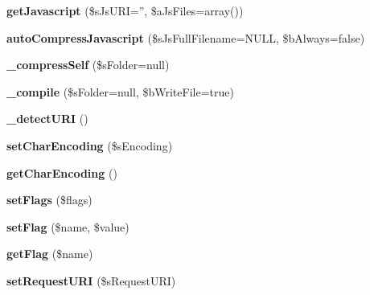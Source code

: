 \begin{DoxyCompactItemize}
\item 
\hypertarget{classxajax_aac03129341890d07050b35a488718118}{
{\bfseries getJavascript} (\$sJsURI='', \$aJsFiles=array())}
\label{classxajax_aac03129341890d07050b35a488718118}

\item 
\hypertarget{classxajax_a9b4cd2b4b2576b16cff68cf4c9843b78}{
{\bfseries autoCompressJavascript} (\$sJsFullFilename=NULL, \$bAlways=false)}
\label{classxajax_a9b4cd2b4b2576b16cff68cf4c9843b78}

\item 
\hypertarget{classxajax_af764cb5ec5b5fa118c7d837ec0d7e990}{
{\bfseries \_\-compressSelf} (\$sFolder=null)}
\label{classxajax_af764cb5ec5b5fa118c7d837ec0d7e990}

\item 
\hypertarget{classxajax_a0b0a2a477413be39dc96ec79fd35211a}{
{\bfseries \_\-compile} (\$sFolder=null, \$bWriteFile=true)}
\label{classxajax_a0b0a2a477413be39dc96ec79fd35211a}

\item 
\hypertarget{classxajax_a2dd296797c91ccd14a99cd9fe88f9a96}{
{\bfseries \_\-detectURI} ()}
\label{classxajax_a2dd296797c91ccd14a99cd9fe88f9a96}

\item 
\hypertarget{classxajax_a116576eb6b07f91b6822c974803b62c5}{
{\bfseries setCharEncoding} (\$sEncoding)}
\label{classxajax_a116576eb6b07f91b6822c974803b62c5}

\item 
\hypertarget{classxajax_a567d84b3395e74844d28ff45294ccdba}{
{\bfseries getCharEncoding} ()}
\label{classxajax_a567d84b3395e74844d28ff45294ccdba}

\item 
\hypertarget{classxajax_a438cf42e941468f6369ff444da8561f1}{
{\bfseries setFlags} (\$flags)}
\label{classxajax_a438cf42e941468f6369ff444da8561f1}

\item 
\hypertarget{classxajax_a1cad7b44886ed8c0cdad09bc53447933}{
{\bfseries setFlag} (\$name, \$value)}
\label{classxajax_a1cad7b44886ed8c0cdad09bc53447933}

\item 
\hypertarget{classxajax_a77a89f40cdd31483226e5d6b6a1895aa}{
{\bfseries getFlag} (\$name)}
\label{classxajax_a77a89f40cdd31483226e5d6b6a1895aa}

\item 
\hypertarget{classxajax_a40a70d3dfc7577b32510af4711151d1f}{
{\bfseries setRequestURI} (\$sRequestURI)}
\label{classxajax_a40a70d3dfc7577b32510af4711151d1f}


\end{DoxyCompactItemize}
